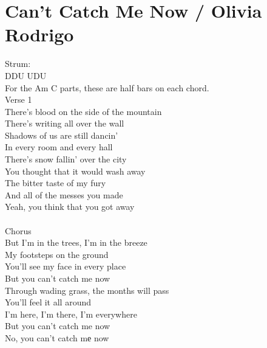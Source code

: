 \section{Can't Catch Me Now / Olivia Rodrigo}\label{sec:cantcatchmenow}

\Aminor
\Cmajor
\Fmajor
\Dminor
\Gmajor
\Eminor

Strum: \\
DDU UDU \\

For the Am C parts, these are half bars on each chord.\\

Verse 1\\
There's blood on the side of the mountain\\
There's writing all over the wall\\
Shadows of us are still dancin'\\
In every room and every hall\\
There's snow fallin' over the city\\
You thought that it would wash away\\
The bitter taste of my fury\\
And all of the messes you made\\
Yeah, you think that you got away\\
\\
Chorus\\
But I'm in the trees, I'm in the breeze\\
My footsteps on the ground\\
You'll see my face in every place\\
But you can't catch me now\\
Through wading grass, the months will pass\\
You'll feel it all around\\
I'm here, I'm there, I'm everywhere\\
But you can't catch me now\\
No, you can't catch mе now \\
